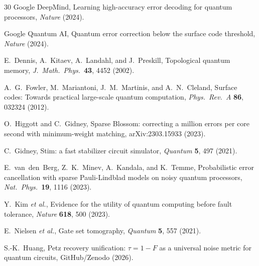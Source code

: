 \documentclass[prl,twocolumn,superscriptaddress,longbibliography]{revtex4-2}
\begin{document}
\begin{thebibliography}{30}
Google DeepMind,
Learning high-accuracy error decoding for quantum processors,
\emph{Nature} (2024).

Google Quantum AI,
Quantum error correction below the surface code threshold,
\emph{Nature} (2024).

E.~Dennis, A.~Kitaev, A.~Landahl, and J.~Preskill,
Topological quantum memory,
\emph{J.\ Math.\ Phys.}\ \textbf{43}, 4452 (2002).

A.~G.~Fowler, M.~Mariantoni, J.~M.~Martinis, and A.~N.~Cleland,
Surface codes: Towards practical large-scale quantum computation,
\emph{Phys.\ Rev.\ A} \textbf{86}, 032324 (2012).

O.~Higgott and C.~Gidney,
Sparse Blossom: correcting a million errors per core second with minimum-weight matching,
arXiv:2303.15933 (2023).

C.~Gidney,
Stim: a fast stabilizer circuit simulator,
\emph{Quantum} \textbf{5}, 497 (2021).

E.~van~den~Berg, Z.~K.~Minev, A.~Kandala, and K.~Temme,
Probabilistic error cancellation with sparse Pauli-Lindblad models on noisy quantum processors,
\emph{Nat.\ Phys.}\ \textbf{19}, 1116 (2023).

Y.~Kim \emph{et al.},
Evidence for the utility of quantum computing before fault tolerance,
\emph{Nature} \textbf{618}, 500 (2023).

E.~Nielsen \emph{et al.},
Gate set tomography,
\emph{Quantum} \textbf{5}, 557 (2021).

S.-K.~Huang,
Petz recovery unification: $\tau = 1 - F$ as a universal noise metric for quantum circuits,
GitHub/Zenodo (2026).

\end{thebibliography}
\end{document}

